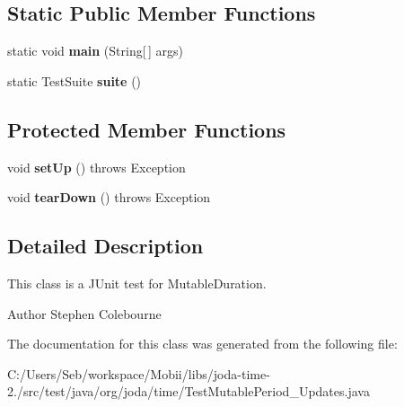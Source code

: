 \subsection*{Static Public Member Functions}
\begin{DoxyCompactItemize}
\item 
\hypertarget{classorg_1_1joda_1_1time_1_1_test_mutable_period___updates_afb25a2d02236e15301fe4761f1044b52}{static void {\bfseries main} (String\mbox{[}$\,$\mbox{]} args)}\label{classorg_1_1joda_1_1time_1_1_test_mutable_period___updates_afb25a2d02236e15301fe4761f1044b52}

\item 
\hypertarget{classorg_1_1joda_1_1time_1_1_test_mutable_period___updates_a7cf55993f5cc1a34ad42f6f40594a819}{static Test\-Suite {\bfseries suite} ()}\label{classorg_1_1joda_1_1time_1_1_test_mutable_period___updates_a7cf55993f5cc1a34ad42f6f40594a819}

\end{DoxyCompactItemize}
\subsection*{Protected Member Functions}
\begin{DoxyCompactItemize}
\item 
\hypertarget{classorg_1_1joda_1_1time_1_1_test_mutable_period___updates_a9a291d34dd312d57b421dadfc709f1e7}{void {\bfseries set\-Up} ()  throws Exception }\label{classorg_1_1joda_1_1time_1_1_test_mutable_period___updates_a9a291d34dd312d57b421dadfc709f1e7}

\item 
\hypertarget{classorg_1_1joda_1_1time_1_1_test_mutable_period___updates_a833dd0a3baad57482eefde28baa31fa1}{void {\bfseries tear\-Down} ()  throws Exception }\label{classorg_1_1joda_1_1time_1_1_test_mutable_period___updates_a833dd0a3baad57482eefde28baa31fa1}

\end{DoxyCompactItemize}


\subsection{Detailed Description}
This class is a J\-Unit test for Mutable\-Duration.

\begin{DoxyAuthor}{Author}
Stephen Colebourne 
\end{DoxyAuthor}


The documentation for this class was generated from the following file\-:\begin{DoxyCompactItemize}
\item 
C\-:/\-Users/\-Seb/workspace/\-Mobii/libs/joda-\/time-\/2./src/test/java/org/joda/time/Test\-Mutable\-Period\-\_\-\-Updates.\-java\end{DoxyCompactItemize}
